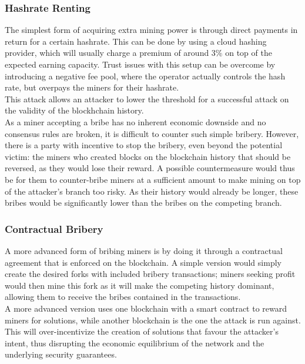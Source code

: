 \documentclass[12pt,a4paper]{article}
\begin{document}
\subsubsection{Hashrate Renting}

The simplest form of acquiring extra mining power is through direct payments in return for a certain \gls{hashrate}. This can be done by using a cloud hashing provider, which will usually charge a premium of around 3\% on top of the expected earning capacity. Trust issues with this setup can be overcome by introducing a negative fee \gls{pool}, where the operator actually controls the hash rate, but overpays the miners for their \gls{hashrate}.\\

This attack allows an attacker to lower the threshold for a successful attack on the validity of the blockhchain history.\\

As a miner accepting a bribe has no inherent economic downside and no consensus rules are broken, it is difficult to counter such simple bribery. However, there is a party with incentive to stop the bribery, even beyond the potential victim: the miners who created blocks on the blockchain history that should be reversed, as they would lose their reward. A possible countermeasure would thus be for them to counter-bribe miners at a sufficient amount to make mining on top of the attacker's branch too risky. As their history would already be longer, these bribes would be significantly lower than the bribes on the competing branch.\\

\subsubsection{Contractual Bribery}

A more advanced form of bribing miners is by doing it through a contractual agreement that is enforced on the blockchain. A simple version would simply create the desired forks with included bribery transactions; miners seeking profit would then mine this fork as it will make the competing history dominant, allowing them to receive the bribes contained in the transactions.\\

A more advanced version uses one \gls{blockchain} with a smart contract to reward miners for solutions, while another \gls{blockchain} is the one the attack is run against. This will over-incentivize the creation of solutions that favour the attacker's intent, thus disrupting the economic equilibrium of the network and the underlying security guarantees.\\
\end{document}
